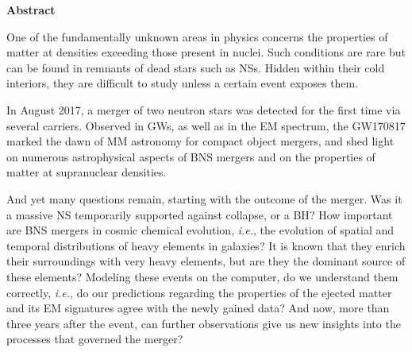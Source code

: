 \documentclass[
openright,
12pt, %
english,%
onehalfspacing, %
nolistspacing, %
nohyperref, %
headsepline, %
]{MastersDoctoralThesis} %
\newcommand{\GW}{GW170817}
\newcommand{\ie}{\textit{i.e.}}
\begin{document}
\cleardoublepage

%    
%    
%    
    \textbf{Abstract}
    
    One of the fundamentally unknown areas in physics concerns the properties of matter at densities exceeding those present in nuclei.
    Such conditions are 
    rare but can be found in remnants of dead stars such as \acp{NS}. Hidden within 
    their cold interiors, they are difficult to study unless a certain event
    exposes them.  
    
    In August 2017, a merger of two neutron stars was detected for the first 
    time via several carriers. 
    Observed in \acp{GW}, as well as in the \ac{EM} spectrum, the \GW{} marked the dawn of 
    \ac{MM} astronomy for compact object mergers, and shed light on numerous astrophysical aspects of \ac{BNS} 
    mergers and on the properties of matter at supranuclear densities. 
    
    And yet many questions remain, starting with the outcome of the merger. Was it a 
    massive \ac{NS} temporarily supported against collapse, or a \ac{BH}? How important are 
    \ac{BNS} mergers
    in cosmic chemical evolution, 
    \ie, the evolution of spatial and temporal distributions of heavy elements in galaxies? It is known that they enrich their 
    surroundings with very heavy elements, but are they the dominant source of these elements?
    Modeling these events on the computer, do we understand them correctly,  \ie,  
    do our predictions regarding the properties of the ejected matter and its \ac{EM} 
    signatures agree with the newly gained data? And now, more than three years after the 
    event, can further observations give us new insights into the processes that 
    governed the merger?
    
\end{document}
